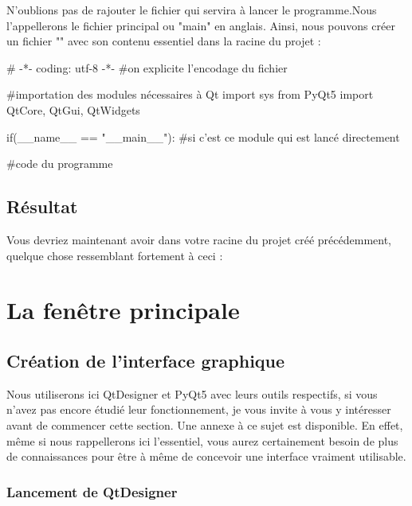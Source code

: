 \documentclass[12pt]{report}    %
\begin{document}
N'oublions pas de rajouter le fichier qui servira à lancer le programme.Nous l'appellerons le fichier principal ou "main" en anglais.\newline
Ainsi, nous pouvons créer un fichier "" avec son contenu essentiel dans la racine du projet :

\begin{pyCode}
# -*- coding: utf-8 -*-
#on explicite l'encodage du fichier

#importation des modules nécessaires à Qt
import sys
from PyQt5 import QtCore, QtGui, QtWidgets


if(__name__ == "__main__"): #si c'est ce module qui est lancé directement

	#code du programme

\end{pyCode}

\subsection{Résultat}

Vous devriez maintenant avoir dans votre racine du projet créé précédemment, quelque chose ressemblant fortement à ceci :



\section{La fenêtre principale}

\subsection{Création de l'interface graphique}

Nous utiliserons ici QtDesigner et PyQt5 avec leurs outils respectifs, si vous n'avez pas encore étudié leur fonctionnement, je vous invite à vous y intéresser avant de commencer cette section. Une annexe à ce sujet est disponible.\newline
En effet, même si nous rappellerons ici l'essentiel, vous aurez certainement besoin de plus de connaissances pour être à même de concevoir une interface vraiment utilisable.

\subsubsection{Lancement de QtDesigner}
\end{document}
